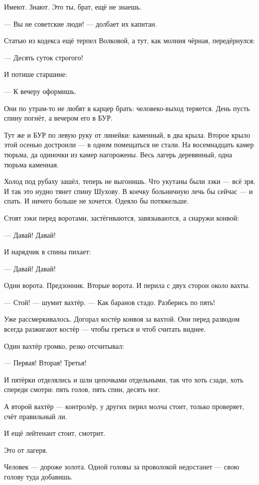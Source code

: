 Имеют. Знают. Это ты, брат, ещё не знаешь.

--- Вы не советские люди! --- долбает их капитан.

Статью из кодекса ещё терпел Волковой, а тут, как молния чёрная, передёрнулся:

--- Десять суток строгого!

И потише старшине:

--- К вечеру оформишь.

Они по утрам-то не любят в карцер брать: человеко-выход теряется. День пусть спину погнёт, а
вечером его в БУР.

Тут же и БУР по левую руку от линейки: каменный, в два крыла. Второе крыло этой осенью
достроили --- в одном помещаться не стали. На восемнадцать камер тюрьма, да одиночки из камер
нагорожены. Весь лагерь деревянный, одна тюрьма каменная.

Холод под рубаху зашёл, теперь не выгонишь. Что укутаны были зэки --- всё зря. И так это нудно
тянет спину Шухову. В коечку больничную лечь бы сейчас --- и спать. И ничего больше не хочется.
Одеяло бы потяжельше.

Стоят зэки перед воротами, застёгиваются, завязываются, а снаружи конвой:

--- Давай! Давай!

И нарядчик в спины пихает:

--- Давай! Давай!

Одни ворота. Предзонник. Вторые ворота. И перила с двух сторон около вахты.

--- Стой! --- шумит вахтёр. --- Как баранов стадо. Разберись по пять!

Уже рассмеркивалось. Догорал костёр конвоя за вахтой. Они перед разводом всегда разжигают
костёр --- чтобы греться и чтоб считать виднее.

Один вахтёр громко, резко отсчитывал:

--- Первая! Вторая! Третья!

И пятёрки отделялись и шли цепочками отдельными, так что хоть сзади, хоть спереди смотри:
пять голов, пять спин, десять ног.

А второй вахтёр --- контролёр, у других перил молча стоит, только проверяет, счёт правильный
ли.

И ещё лейтенант стоит, смотрит.

Это от лагеря.

Человек --- дороже золота. Одной головы за проволокой недостанет --- свою голову туда добавишь.

